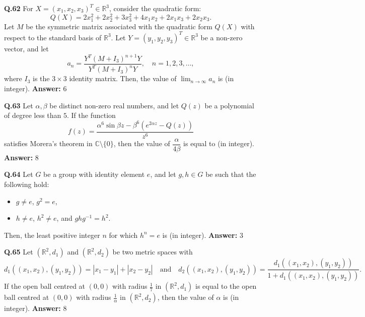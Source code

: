 \documentclass[11pt,a4paper]{article}
\newcommand{\ans}[1]{\textbf{Answer:} #1\par\medskip}
\begin{document}
\textbf{Q.62} For $X = (x_1, x_2, x_3)^T \in \mathbb{R}^3$, consider the quadratic form:
\[
  Q(X) = 2x_1^2 + 2x_2^2 + 3x_3^2 + 4x_1 x_2 + 2x_1 x_3 + 2x_2 x_3.
\]
Let $M$ be the symmetric matrix associated with the quadratic form $Q(X)$ with respect to the standard basis of $\mathbb{R}^3$. Let $Y = (y_1, y_2, y_3)^T \in \mathbb{R}^3$ be a non-zero vector, and let
\[
  a_n = \frac{Y^T (M + I_3)^{n+1} Y}{Y^T (M + I_3)^n Y}, \quad n = 1, 2, 3, \ldots,
\]
where $I_3$ is the $3 \times 3$ identity matrix. Then, the value of $\lim_{n \to \infty} a_n$ is \underline{\hspace{2cm}} (in integer).
\ans{$6$}

\textbf{Q.63} Let $\alpha, \beta$ be distinct non-zero real numbers, and let $Q(z)$ be a polynomial of degree less than $5$. If the function
\[
  f(z) = \frac{\alpha^6 \sin \beta z - \beta^6(e^{2\alpha z} - Q(z))}{z^6}
\]
satisfies Morera's theorem in $\mathbb{C} \setminus \{0\}$, then the value of $\dfrac{\alpha}{4\beta}$ is equal to \underline{\hspace{2cm}} (in integer).
\ans{$8$}

\textbf{Q.64} Let $G$ be a group with identity element $e$, and let $g, h \in G$ be such that the following hold:
\begin{itemize}
  \setlength{\itemsep}{1pt}\setlength{\parskip}{0pt}
  \item[(i)] $g \ne e$, $g^2 = e$,
  \item[(ii)] $h \ne e$, $h^2 \ne e$, and $g h g^{-1} = h^2$.
\end{itemize}
Then, the least positive integer $n$ for which $h^n = e$ is \underline{\hspace{2cm}} (in integer).
\ans{$3$}

\textbf{Q.65} Let $(\mathbb{R}^2, d_1)$ and $(\mathbb{R}^2, d_2)$ be two metric spaces with
\[
  d_1((x_1, x_2), (y_1, y_2)) = |x_1 - y_1| + |x_2 - y_2| \quad \text{and} \quad d_2((x_1, x_2), (y_1, y_2)) = \frac{d_1((x_1, x_2), (y_1, y_2))}{1 + d_1((x_1, x_2), (y_1, y_2))}.
\]
If the open ball centred at $(0, 0)$ with radius $\frac{1}{7}$ in $(\mathbb{R}^2, d_1)$ is equal to the open ball centred at $(0, 0)$ with radius $\frac{1}{\alpha}$ in $(\mathbb{R}^2, d_2)$, then the value of $\alpha$ is \underline{\hspace{2cm}} (in integer).
\ans{$8$}

\end{document}
